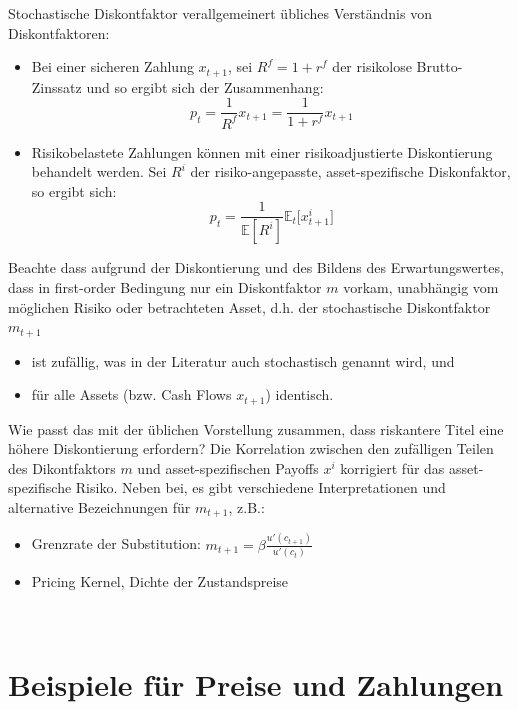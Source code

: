 \documentclass[12pt]{extreport} %
\theoremstyle{named}
\theoremstyle{nnamed}
\theoremstyle{itshape}
\theoremstyle{normal}
\begin{document}
Stochastische Diskontfaktor verallgemeinert übliches Verständnis von Diskontfaktoren:

\begin{itemize}
	\item Bei einer sicheren Zahlung $x_{t+1}$, sei $R^f = 1 + r^f$ der risikolose Brutto-Zinssatz und so ergibt sich der Zusammenhang: $$p_t = \frac{1}{R^f} x_{t+1} = \frac{1}{1+r^f} x_{t+1}$$
	\item Risikobelastete Zahlungen können mit einer risikoadjustierte Diskontierung behandelt werden. Sei $R^i$ der risiko-angepasste, asset-spezifische Diskonfaktor, so ergibt sich: $$p_t = \frac{1}{\mathbb{E} \left[R^i \right]} \mathbb{E}_t \big[ x_{t+1}^i \big]$$
\end{itemize}

Beachte dass aufgrund der Diskontierung und des Bildens des Erwartungswertes, dass in first-order Bedingung nur ein Diskontfaktor $m$ vorkam, unabhängig vom möglichen Risiko oder betrachteten Asset, d.h. der stochastische Diskontfaktor $m_{t+1}$
\begin{itemize}
	\item ist zufällig, was in der Literatur auch stochastisch genannt wird, und
	\item für alle Assets (bzw. Cash Flows $x_{t+1}$) identisch.
\end{itemize}
Wie passt das mit der üblichen Vorstellung zusammen, dass riskantere Titel eine höhere Diskontierung erfordern? Die Korrelation zwischen den zufälligen Teilen des Dikontfaktors $m$ und asset-spezifischen Payoffs $x^i$ korrigiert für das asset-spezifische Risiko. Neben bei, es gibt verschiedene Interpretationen und alternative Bezeichnungen für $m_{t+1}$, z.B.:
\begin{itemize}
	\item Grenzrate der Substitution: $m_{t+1} = \beta \frac{u'(c_{t+1})}{u'(c_t)}$
	\item Pricing Kernel, Dichte der Zustandspreise
\end{itemize}
~\newpage
\section{Beispiele für Preise und Zahlungen}
\end{document}
